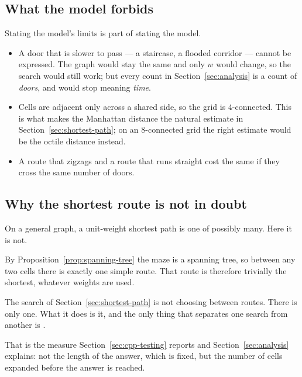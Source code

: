 \subsection{What the model forbids}

Stating the model's limits is part of stating the model.

\begin{itemize}[leftmargin=*,itemsep=3pt]
  \item {} A door that is slower to pass --- a
        staircase, a flooded corridor --- cannot be expressed. The graph would
        stay the same and only $w$ would change, so the search would still
        work; but every count in Section~\ref{sec:analysis} is a count of
        \emph{doors}, and would stop meaning \emph{time}.
  \item {} Cells are adjacent only across a shared
        side, so the grid is $4$-connected. This is what makes the Manhattan
        distance the natural estimate in Section~\ref{sec:shortest-path}; on an
        $8$-connected grid the right estimate would be the octile distance
        instead.
  \item {} A route that zigzags and a route that
        runs straight cost the same if they cross the same number of doors.
\end{itemize}

\subsection{Why the shortest route is not in doubt}

On a general graph, a unit-weight shortest path is one of possibly many. Here it
is not.

By Proposition~\ref{prop:spanning-tree} the maze is a spanning tree, so between
any two cells there is exactly one simple route. That route is therefore
trivially the shortest, whatever weights are used.

\begin{keypoint}
The search of Section~\ref{sec:shortest-path} is not choosing between routes.
There is only one. What it does is  it, and the only thing that
separates one search from another is .
\end{keypoint}

That is the measure Section~\ref{sec:cpp-testing} reports and
Section~\ref{sec:analysis} explains: not the length of the answer, which is
fixed, but the number of cells expanded before the answer is reached.
